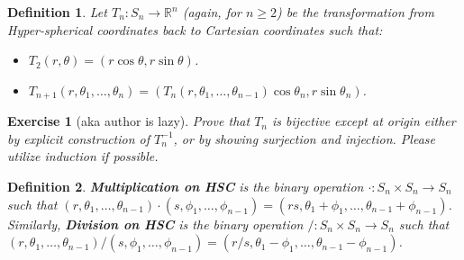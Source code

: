 \documentclass{article}
\theoremstyle{plain}
\newtheorem{definition}{Definition}[section]
\newtheorem{exercise}{Exercise}[section]
\begin{document}
\begin{definition}\label{hsc}
Let $T_n: S_n \rightarrow \mathbb{R}^n$ (again, for $n \ge 2$) be the transformation from Hyper-spherical coordinates back to Cartesian coordinates such that:
\begin{itemize}
	\item $T_2(r, \theta) = (r \cos{\theta}, r \sin{\theta})$.
	\item $T_{n+1}(r, \theta_1, \ldots, \theta_n) = (T_n(r,  \theta_1, \ldots, \theta_{n-1}) \cos{\theta_n}, r \sin{\theta_n})$.
\end{itemize}
\end{definition}

\begin{exercise}[aka author is lazy]
Prove that $T_n$ is bijective \textit{except at origin} either by explicit construction of $T_n^{-1}$, or by showing surjection and injection. Please utilize induction if possible.
\end{exercise}

\begin{definition}
\textbf{Multiplication on HSC} is the binary operation $\cdot: S_n \times S_n \rightarrow S_n$ such that $(r, \theta_1, \ldots, \theta_{n-1}) \cdot (s, \phi_1, \ldots, \phi_{n-1}) = (rs, \theta_1 + \phi_1, \ldots, \theta_{n-1} + \phi_{n-1})$. Similarly, \textbf{Division on HSC} is the binary operation $/: S_n \times S_n \rightarrow S_n$ such that $(r, \theta_1, \ldots, \theta_{n-1}) / (s, \phi_1, \ldots, \phi_{n-1}) = (r/s, \theta_1 - \phi_1, \ldots, \theta_{n-1} - \phi_{n-1})$.
\end{definition}
\end{document}
